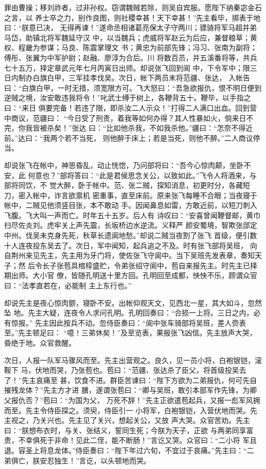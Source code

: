 罪由曹操；移刘祚者，过非孙权。窃谓魏贼若除，则吴自宾服。愿陛下纳秦宓金石之言，以
养士卒之力，别作良图，则社稷幸甚！天下幸甚！”先主看毕，掷表于地曰：“朕意已决，
无得再谏！”遂命丞相诸葛亮保太子守两川；骠骑将军马超并弟马岱，助镇北将军魏延守汉
中，以当魏兵；虎威将军赵云为后应，兼督粮草；黄权、程畿为参谋；马良、陈震掌理文
书；黄忠为前部先锋；冯习、张南为副将；傅彤、张翼为中军护尉；赵融、廖淳为合后。川
将数百员，并五溪番将等，共兵七十五万，择定章武元年七月丙寅日出师。却说张飞回到阆
中，下令军中；限三日内制办白旗白甲，三军挂孝伐吴。次日，帐下两员末将范疆、张达，
入帐告曰：“白旗白甲，一时无措，须宽限方可。飞大怒曰：“吾急欲报仇，恨不明日便到
逆贼之境，汝安敢违我将令！”叱武士缚于树上，各鞭背五十。鞭毕，以手指之曰：“来日
俱要完备！若违了限，即杀汝二人示众！”打得二人满口出血。回到营中商议，范疆曰：
“今日受了刑责，着我等如何办得？其人性暴如火，倘来日不完，你我皆被杀矣！”张达
曰：“比如他杀我，不如我杀他。”疆曰：“怎奈不得近前。”达曰：“我两个若不当死，
则他醉于床上；若是当死，则他不醉。”二人商议停当。

却说张飞在帐中，神思昏乱，动止恍惚，乃问部将曰：“吾今心惊肉颠，坐卧不安，此
何意也？”部将答曰：“此是君侯思念关公，以致如此。”飞令人将酒来，与部将同饮，不
觉大醉，卧于帐中。范、张二贼，探知消息，初更时分，各藏短刀，密入帐中，诈言欲禀机
密重事，直至床前。原来张飞每睡不合眼；当夜寝于帐中，二贼见他须竖目张，本不敢动
手。因闻鼻息如雷，方敢近前，以短刀刺入飞腹。飞大叫一声而亡。时年五十五岁。后人有
诗叹曰：“安喜曾闻鞭督邮，黄巾扫尽佐炎刘。虎牢关上声先震，长坂桥边水逆流。义释严
颜安蜀境，智欺张郃定中州。伐吴未克身先死，秋草长遗阆地愁。”却说二贼当夜割了张飞
首级，便引数十人连夜投东吴去了。次日，军中闻知，起兵追之不及。时有张飞部将吴班，
向自荆州来见先主，先主用为牙门将，使佐张飞守阆中。当下吴班先发表章，奏知天子；然
后令长子张苞具棺椁盛贮，令弟张绍守阆中，苞自来报先主。时先主已择期出师。大小官
僚，皆随孔明送十里方回。孔明回至成都，怏怏不乐，顾谓众官曰：“法孝直若在，必能制
主上东行也。”

却说先主是夜心惊肉颤，寝卧不安。出帐仰观天文，见西北一星，其大如斗，忽然坠
地。先主大疑，连夜令人求问孔明。孔明回奏曰：“合损一上将。三日之内，必有惊报。”
先主因此按兵不动。忽侍臣奏曰：“阆中张车骑部将吴班，差人赍表至。”先主顿足曰：
“噫！三弟休矣！”及至览表，果报张飞凶信。先主放声大哭，昏绝于地。众官救醒。

次日，人报一队军马骤风而至。先主出营观之。良久，见一员小将，白袍银铠，滚鞍下
马，伏地而哭，乃张苞也。苞曰：“范疆、张达杀了臣父，将首级投吴去了！”先主哀痛至
甚，饮食不进。群臣苦谏曰：“陛下方欲为二弟报仇，何可先自摧残龙体？”先主方才进
膳，遂谓张苞曰：“卿与吴班，敢引本部军作先锋，为卿父报仇否？”苞曰：“为国为父，
万死不辞！”先主正欲遣苞起兵，又报一彪军风拥而至。先主令侍臣探之。须臾，侍臣引一
小将军，白袍银铠，入营伏地而哭。先主视之，乃关兴也。先主见了关兴，想起关公，又放
声大哭。众官苦劝。先主曰：“朕想布衣时，与关、张结义，誓同生死；今朕为天子，正欲
与两弟同享富贵，不幸俱死于非命！见此二侄，能不断肠！”言讫又哭。众官曰：“二小将
军且退。容圣上将息龙体。”侍臣奏曰：“陛下年过六旬，不宜过于哀痛。”先主曰：“二
弟俱亡，朕安忍独生！”言讫，以头顿地而哭。

